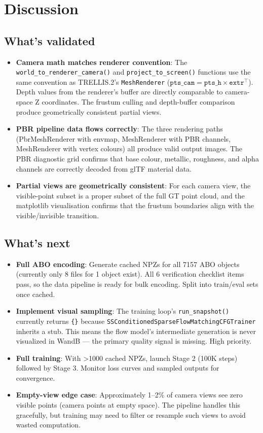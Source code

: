 \section{Discussion}

\subsection{What's validated}

\begin{itemize}
  \item \textbf{Camera math matches renderer convention}: The
  \texttt{world\_to\_renderer\_camera()} and \texttt{project\_to\_screen()}
  functions use the same convention as TRELLIS.2's \texttt{MeshRenderer}
  ($\texttt{pts\_cam} = \texttt{pts\_h} \times \texttt{extr}^\top$).
  Depth values from the renderer's buffer are directly comparable to
  camera-space Z coordinates. The frustum culling and depth-buffer
  comparison produce geometrically consistent partial views.
  \item \textbf{PBR pipeline data flows correctly}: The three rendering
  paths (PbrMeshRenderer with envmap, MeshRenderer with PBR channels,
  MeshRenderer with vertex colours) all produce valid output images. The
  PBR diagnostic grid confirms that base colour, metallic, roughness, and
  alpha channels are correctly decoded from glTF material data.
  \item \textbf{Partial views are geometrically consistent}: For each
  camera view, the visible-point subset is a proper subset of the full GT
  point cloud, and the matplotlib visualisation confirms that the frustum
  boundaries align with the visible/invisible transition.
\end{itemize}

\subsection{What's next}

\begin{itemize}
  \item \textbf{Full ABO encoding}: Generate cached NPZs for all 7157 ABO
  objects (currently only 8 files for 1 object exist). All 6 verification
  checklist items pass, so the data pipeline is ready for bulk encoding.
  Split into train/eval sets once cached.
  \item \textbf{Implement visual sampling}: The training loop's
  \texttt{run\_snapshot()} currently returns \texttt{\{\}} because
  \texttt{SSConditionedSparseFlowMatchingCFGTrainer} inherits a stub. This
  means the flow model's intermediate generation is never visualized in
  WandB --- the primary quality signal is missing. High priority.
  \item \textbf{Full training}: With \textgreater{}1000 cached NPZs,
  launch Stage 2 (100K steps) followed by Stage 3. Monitor loss curves
  and sampled outputs for convergence.
  \item \textbf{Empty-view edge case}: Approximately 1--2\% of camera views
  see zero visible points (camera points at empty space). The pipeline
  handles this gracefully, but training may need to filter or resample
  such views to avoid wasted computation.
\end{itemize}
